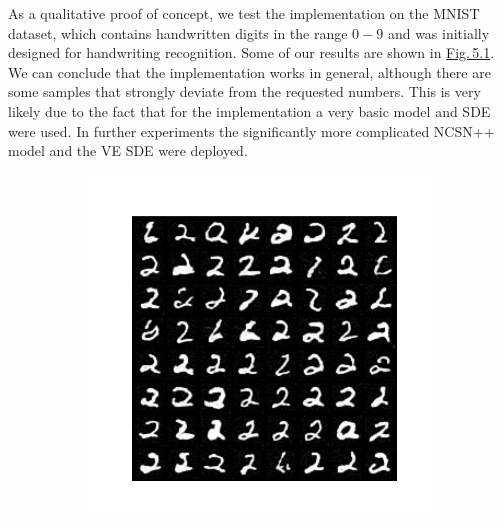 As a qualitative proof of concept, we test the implementation on the MNIST \cite{mnist} dataset, which contains handwritten digits in the range $0-9$ and was initially designed for handwriting recognition. Some of our results are shown in \hyperref[fig:5.1]{Fig.\,5.1}. We can conclude that the implementation works in general, although there are some samples that strongly deviate from the requested numbers. This is very likely due to the fact that for the implementation a very basic model and SDE were used. In further experiments the significantly more complicated NCSN++ model and the VE SDE were deployed.
%
\begin{figure} \label{fig:5.1}
    \begin{subfigure}{0.3\textwidth} \label{abb:1a}
        \centering
        \includegraphics[width=\textwidth]{Chapters/figures/experiments/mnist/mnist_2.png}
    \end{subfigure}
    \begin{subfigure}{0.3\textwidth} \label{abb:1a}
        \centering

\end{subfigure}
\end{figure}
